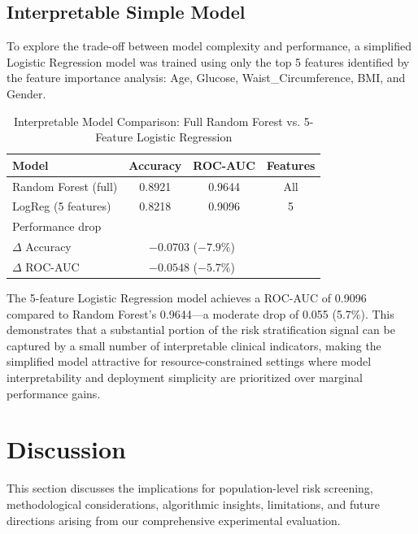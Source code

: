 \documentclass[conference,10pt]{IEEEtran}
\begin{document}
\subsection{Interpretable Simple Model}
\label{subsec:interpretable}

To explore the trade-off between model complexity and performance, a simplified Logistic Regression model was trained using only the top 5 features identified by the feature importance analysis: Age, Glucose, Waist\_Circumference, BMI, and Gender.

\begin{table}[!t]
\centering
\caption{Interpretable Model Comparison: Full Random Forest vs. 5-Feature Logistic Regression}
\label{tab:interpretable}
\begin{tabular}{lccc}
\toprule
\textbf{Model} & \textbf{Accuracy} & \textbf{ROC-AUC} & \textbf{Features} \\
\midrule
Random Forest (full) & 0.8921 & 0.9644 & All \\
LogReg (5 features) & 0.8218 & 0.9096 & 5 \\
\midrule
\multicolumn{3}{l}{Performance drop} & \\
$\Delta$ Accuracy & \multicolumn{2}{c}{$-0.0703$ ($-7.9\%$)} & \\
$\Delta$ ROC-AUC  & \multicolumn{2}{c}{$-0.0548$ ($-5.7\%$)} & \\
\bottomrule
\end{tabular}
\end{table}

The 5-feature Logistic Regression model achieves a ROC-AUC of 0.9096 compared to Random Forest's 0.9644---a moderate drop of 0.055 (5.7\%). This demonstrates that a substantial portion of the risk stratification signal can be captured by a small number of interpretable clinical indicators, making the simplified model attractive for resource-constrained settings where model interpretability and deployment simplicity are prioritized over marginal performance gains.


\section{Discussion}
\label{sec:discussion}

This section discusses the implications for population-level risk screening, methodological considerations, algorithmic insights, limitations, and future directions arising from our comprehensive experimental evaluation.
\end{document}
